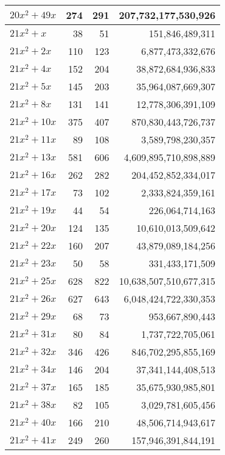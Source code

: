 \documentclass[a4paper]{amsproc}
\theoremstyle{plain}
\begin{document}
\begin{longtable}{ | l | r | r | r | }
$20x^2 + 49x$ & 274 & 291 & 207{,}732{,}177{,}530{,}926 \\ \hline
$21x^2 + x$ & 38 & 51 & 151{,}846{,}489{,}311 \\ \hline
$21x^2 + 2x$ & 110 & 123 & 6{,}877{,}473{,}332{,}676 \\ \hline
$21x^2 + 4x$ & 152 & 204 & 38{,}872{,}684{,}936{,}833 \\ \hline
$21x^2 + 5x$ & 145 & 203 & 35{,}964{,}087{,}669{,}307 \\ \hline
$21x^2 + 8x$ & 131 & 141 & 12{,}778{,}306{,}391{,}109 \\ \hline
$21x^2 + 10x$ & 375 & 407 & 870{,}830{,}443{,}726{,}737 \\ \hline
$21x^2 + 11x$ & 89 & 108 & 3{,}589{,}798{,}230{,}357 \\ \hline
$21x^2 + 13x$ & 581 & 606 & 4{,}609{,}895{,}710{,}898{,}889 \\ \hline
$21x^2 + 16x$ & 262 & 282 & 204{,}452{,}852{,}334{,}017 \\ \hline
$21x^2 + 17x$ & 73 & 102 & 2{,}333{,}824{,}359{,}161 \\ \hline
$21x^2 + 19x$ & 44 & 54 & 226{,}064{,}714{,}163 \\ \hline
$21x^2 + 20x$ & 124 & 135 & 10{,}610{,}013{,}509{,}642 \\ \hline
$21x^2 + 22x$ & 160 & 207 & 43{,}879{,}089{,}184{,}256 \\ \hline
$21x^2 + 23x$ & 50 & 58 & 331{,}433{,}171{,}509 \\ \hline
$21x^2 + 25x$ & 628 & 822 & 10{,}638{,}507{,}510{,}677{,}315 \\ \hline
$21x^2 + 26x$ & 627 & 643 & 6{,}048{,}424{,}722{,}330{,}353 \\ \hline
$21x^2 + 29x$ & 68 & 73 & 953{,}667{,}890{,}443 \\ \hline
$21x^2 + 31x$ & 80 & 84 & 1{,}737{,}722{,}705{,}061 \\ \hline
$21x^2 + 32x$ & 346 & 426 & 846{,}702{,}295{,}855{,}169 \\ \hline
$21x^2 + 34x$ & 146 & 204 & 37{,}341{,}144{,}408{,}513 \\ \hline
$21x^2 + 37x$ & 165 & 185 & 35{,}675{,}930{,}985{,}801 \\ \hline
$21x^2 + 38x$ & 82 & 105 & 3{,}029{,}781{,}605{,}456 \\ \hline
$21x^2 + 40x$ & 166 & 210 & 48{,}506{,}714{,}943{,}617 \\ \hline
$21x^2 + 41x$ & 249 & 260 & 157{,}946{,}391{,}844{,}191 \\ \hline

\end{longtable}
\end{document}
